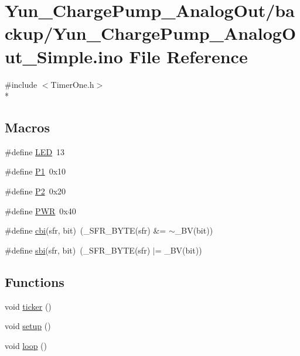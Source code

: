 \hypertarget{Yun__ChargePump__AnalogOut__Simple_8ino}{\section{Yun\-\_\-\-Charge\-Pump\-\_\-\-Analog\-Out/backup/\-Yun\-\_\-\-Charge\-Pump\-\_\-\-Analog\-Out\-\_\-\-Simple.ino File Reference}
\label{Yun__ChargePump__AnalogOut__Simple_8ino}
}
{\ttfamily \#include $<$Timer\-One.\-h$>$}\\*
\subsection*{Macros}
\begin{DoxyCompactItemize}
\item 
\#define \hyperlink{Yun__ChargePump__AnalogOut__Simple_8ino_aeb7a7ba1ab7e0406f1b5ab36d579f585}{L\-E\-D}~13
\item 
\#define \hyperlink{Yun__ChargePump__AnalogOut__Simple_8ino_a6c2a9f7efd46f0160f3037869924d6ce}{P1}~0x10
\item 
\#define \hyperlink{Yun__ChargePump__AnalogOut__Simple_8ino_ae00a52dba55d31948c377fa85d385b87}{P2}~0x20
\item 
\#define \hyperlink{Yun__ChargePump__AnalogOut__Simple_8ino_a04651c526497822a859942b928e57f8e}{P\-W\-R}~0x40
\item 
\#define \hyperlink{Yun__ChargePump__AnalogOut__Simple_8ino_ae70baf5399951da1e7ad45a0ed890832}{cbi}(sfr, bit)~(\-\_\-\-S\-F\-R\-\_\-\-B\-Y\-T\-E(sfr) \&= $\sim$\-\_\-\-B\-V(bit))
\item 
\#define \hyperlink{Yun__ChargePump__AnalogOut__Simple_8ino_ac4a5536d9bf092116f88b94797ddc882}{sbi}(sfr, bit)~(\-\_\-\-S\-F\-R\-\_\-\-B\-Y\-T\-E(sfr) $\vert$= \-\_\-\-B\-V(bit))
\end{DoxyCompactItemize}
\subsection*{Functions}
\begin{DoxyCompactItemize}
\item 
void \hyperlink{Yun__ChargePump__AnalogOut__Simple_8ino_a6a015280c1363331ada8a329be6eb7c8}{ticker} ()
\item 
void \hyperlink{Yun__ChargePump__AnalogOut__Simple_8ino_a4fc01d736fe50cf5b977f755b675f11d}{setup} ()
\item 
void \hyperlink{Yun__ChargePump__AnalogOut__Simple_8ino_afe461d27b9c48d5921c00d521181f12f}{loop} ()
\end{DoxyCompactItemize}
